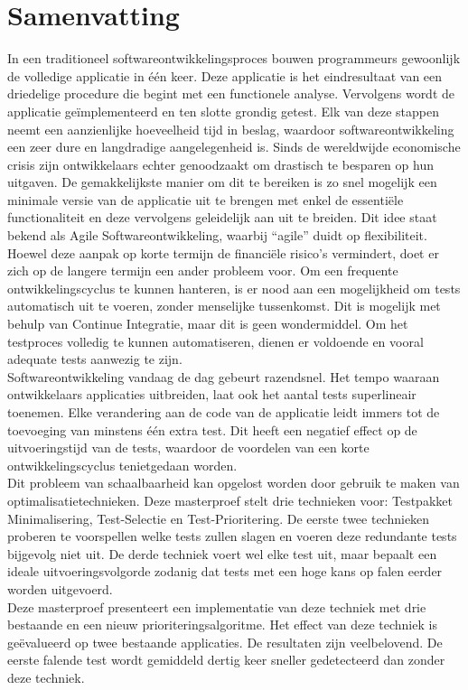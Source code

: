 
\chapter*{Samenvatting}
In een traditioneel softwareontwikkelingsproces bouwen programmeurs gewoonlijk de volledige applicatie in één keer. Deze applicatie is het eindresultaat van een driedelige procedure die begint met een functionele analyse. Vervolgens wordt de applicatie ge\"implementeerd en ten slotte grondig getest. Elk van deze stappen neemt een aanzienlijke hoeveelheid tijd in beslag, waardoor softwareontwikkeling een zeer dure en langdradige aangelegenheid is. Sinds de wereldwijde economische crisis zijn ontwikkelaars echter genoodzaakt om drastisch te besparen op hun uitgaven. De gemakkelijkste manier om dit te bereiken is zo snel mogelijk een minimale versie van de applicatie uit te brengen met enkel de essenti\"ele functionaliteit en deze vervolgens geleidelijk aan uit te breiden. Dit idee staat bekend als Agile Softwareontwikkeling, waarbij ``agile'' duidt op flexibiliteit.\\

\noindent Hoewel deze aanpak op korte termijn de financiële risico's vermindert, doet er zich op de langere termijn een ander probleem voor. Om een frequente ontwikkelingscyclus te kunnen hanteren, is er nood aan een mogelijkheid om tests automatisch uit te voeren, zonder menselijke tussenkomst. Dit is mogelijk met behulp van Continue Integratie, maar dit is geen wondermiddel. Om het testproces volledig te kunnen automatiseren, dienen er voldoende en vooral adequate tests aanwezig te zijn.\\

\noindent Softwareontwikkeling vandaag de dag gebeurt razendsnel. Het tempo waaraan ontwikkelaars applicaties uitbreiden, laat ook het aantal tests superlineair toenemen. Elke verandering aan de code van de applicatie leidt immers tot de toevoeging van minstens één extra test. Dit heeft een negatief effect op de uitvoeringstijd van de tests, waardoor de voordelen van een korte ontwikkelingscyclus tenietgedaan worden.\\

\noindent Dit probleem van schaalbaarheid kan opgelost worden door gebruik te maken van optimalisatietechnieken. Deze masterproef stelt drie technieken voor: Testpakket Minimalisering, Test-Selectie en Test-Prioritering. De eerste twee technieken proberen te voorspellen welke tests zullen slagen en voeren deze redundante tests bijgevolg niet uit. De derde techniek voert wel elke test uit, maar bepaalt een ideale uitvoeringsvolgorde zodanig dat tests met een hoge kans op falen eerder worden uitgevoerd.\\

\noindent Deze masterproef presenteert een implementatie van deze techniek met drie bestaande en een nieuw prioriteringsalgoritme. Het effect van deze techniek is ge\"evalueerd op twee bestaande applicaties. De resultaten zijn veelbelovend. De eerste falende test wordt gemiddeld dertig keer sneller gedetecteerd dan zonder deze techniek.